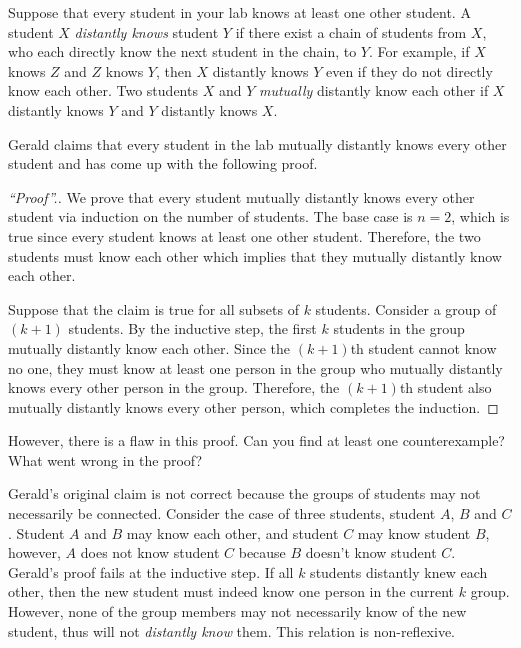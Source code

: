 \documentclass{article}
\begin{document}
\begin{question}
Suppose that every student in your lab knows at least one other student. A student $X$ {\em distantly knows} student $Y$ if there exist a chain of students from $X$, who each directly know the next student in the chain, to $Y$. For example, if $X$ knows $Z$ and $Z$ knows $Y$, then $X$ distantly knows $Y$ even if they do not directly know each other. Two students $X$ and $Y$ {\em mutually} distantly know each other if $X$ distantly knows $Y$ and $Y$ distantly knows $X$.

Gerald claims that every student in the lab mutually distantly knows every other student and has come up with the following proof.
\begin{proof}[``Proof''.]
We prove that every student mutually distantly knows every other student via induction on the number of students. The base case is $n = 2$, which is true since every student knows at least one other student. Therefore, the two students must know each other which implies that they mutually distantly know each other.

Suppose that the claim is true for all subsets of $k$ students. Consider a group of $(k + 1)$ students. By the inductive step, the first $k$ students in the group mutually distantly know each other. Since the $(k + 1)$th student cannot know no one, they must know at least one person in the group who mutually distantly knows every other person in the group. Therefore, the $(k + 1)$th student also mutually distantly knows every other person, which completes the induction.
\end{proof}

However, there is a flaw in this proof. Can you find at least one counterexample? What went wrong in the proof?
\end{question}

\begin{solution}
Gerald's original claim is not correct because the groups of students may not necessarily be connected. Consider the case of three students, student $A$, $B$ and $C$. Student $A$ and $B$ may know each other, and student $C$ may know student $B$, however, $A$ does not know student $C$ because $B$ doesn't know student $C$.\\

Gerald's proof fails at the inductive step. If all $k$ students distantly knew each other, then the new student must indeed know one person in the current $k$ group.  However, none of the group members may not necessarily know of the new student, thus will not \textit{distantly know} them. This relation is non-reflexive.
\end{solution}
\end{document}
